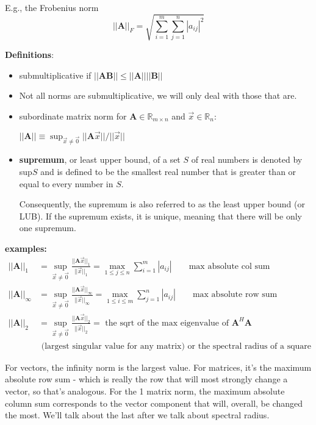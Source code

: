 \documentclass[12pt]{article}
\newcommand{\ve}[1]{\ensuremath{\mathbf{#1}}}
\begin{document}
E.g., the Frobenius norm 
%
\begin{equation}
||\ve{A}||_F = \sqrt{ \sum_{i=1}^m \sum_{j=1}^n |a_{ij}|^2 } \nonumber
\end{equation}

\textbf{Definitions}:
\begin{itemize}
\item submultiplicative if $||\ve{A} \ve{B}|| \leq ||\ve{A}|| ||\ve{B}||$

\item Not all norms are submultiplicative, we will only deal with those that are. 

\item subordinate matrix norm for $\ve{A} \in \mathbb{R}_{m \times n}$ and $\vec{x} \in \mathbb{R}_n$:

$||\ve{A}|| \equiv \displaystyle \sup_{\vec{x} \neq \vec{0}} ||\ve{A}\vec{x}|| / ||\vec{x}||$

\item \textbf{supremum}, or least upper bound, of a set $S$ of real numbers is denoted by sup$S$ and is defined to be the smallest real number that is greater than or equal to every number in $S$.

Consequently, the supremum is also referred to as the least upper bound (or LUB). If the supremum exists, it is unique, meaning that there will be only one supremum. 
\end{itemize}


\textbf{examples:}
%
\begin{align}
||\ve{A}||_{1} &= \displaystyle \sup_{\vec{x} \neq \vec{0}} \frac{||\ve{A}\vec{x}||_{1}}{||\vec{x}||_{1}} =
\displaystyle \max_{1 \leq j \leq n} \sum_{i=1}^m |a_{ij}| \qquad \text{max absolute col sum} \nonumber \\
%
||\ve{A}||_{\infty} &= \displaystyle \sup_{\vec{x} \neq \vec{0}} \frac{||\ve{A}\vec{x}||_{\infty}}{||\vec{x}||_{\infty}} = 
\displaystyle \max_{1 \leq i \leq m} \sum_{j=1}^n |a_{ij}| \qquad \text{max absolute row sum}\nonumber \\
%
||\ve{A}||_{2} &= \displaystyle \sup_{\vec{x} \neq \vec{0}} \frac{||\ve{A}\vec{x}||_{2}}{||\vec{x}||_{2}} = \text{ the sqrt of the max  eigenvalue of }\ve{A}^H\ve{A} \nonumber \\
&\text{ (largest singular value for any matrix) or the spectral radius of a square matrix} \nonumber 
\end{align}

For vectors, the infinity norm is the largest value. For matrices, it's the maximum absolute row sum - which is really the row that will most strongly change a vector, so that's analogous. For the 1 matrix norm, the maximum absolute column sum corresponds to the vector component that will, overall, be changed the most. We'll talk about the last after we talk about spectral radius.
\end{document}
